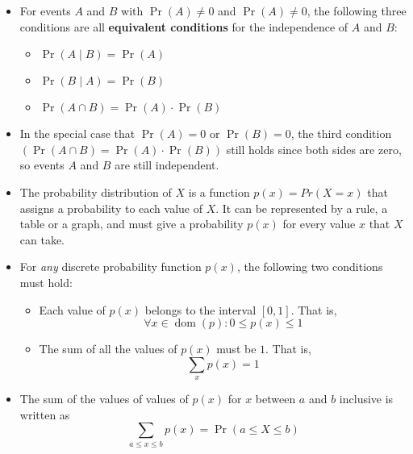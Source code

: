 \documentclass[12pt,a4paper,titlepage]{article}
\DeclareMathOperator{\dom}{dom}
\begin{document}
            \begin{SummaryBox}[title=Independent events]
                \begin{itemize}[leftmargin=*]
                    \item For events $A$ and $B$ with $\Pr(A) \neq 0$ and $\Pr(A) \neq 0$, the following three conditions are all \textbf{equivalent conditions} for the independence of $A$ and $B$:
                    \begin{itemize}[topsep=0pt]
                        \item $\Pr(A \mid B) = \Pr(A)$
                        \item $\Pr(B \mid A) = \Pr(B)$
                        \item $\Pr(A \cap B) = \Pr(A) \cdot \Pr(B)$
                    \end{itemize}
                    \item In the special case that $\Pr(A) = 0$ or $\Pr(B) = 0$, the third condition $( \Pr(A \cap B) = \Pr(A) \cdot \Pr(B) )$ still holds since both sides are zero, so events $A$ and $B$ are still independent.
                \end{itemize}
            \end{SummaryBox}
            
            \begin{SummaryBox}[title=Discrete probability functions]
                \begin{itemize}[leftmargin=*]
                    \item The probability distribution of $X$ is a function $p(x) = Pr(X = x)$ that assigns a probability to each value of $X$. It can be represented by a rule, a table or a graph, and must give a probability $p(x)$ for every value $x$ that $X$ can take.
                    \item For \textit{any} discrete probability function $p(x)$, the following two conditions must hold:
                    \begin{itemize}[topsep=0pt]
                        \item Each value of $p(x)$ belongs to the interval $[0,1]$. That is,
                        \[
                            \forall x \in \dom(p): 0 \leq p(x) \leq 1
                        \]
                        \item The sum of all the values of $p(x)$ must be $1$. That is,
                        \[
                            \sum\limits_{x} p(x) = 1
                        \]
                    \end{itemize}
                    \item The sum of the values of values of $p(x)$ for $x$ between $a$ and $b$ inclusive is written as
                    \[
                        \sum\limits_{a \leq x \leq b} p(x) = \Pr(a \leq X \leq b)
                    \]
                \end{itemize}
            \end{SummaryBox}
            
\end{document}
